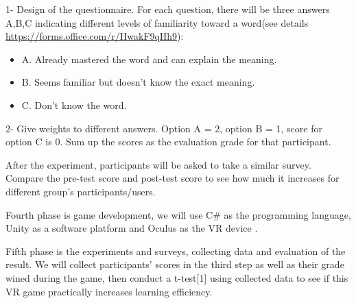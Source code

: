 \documentclass{vgtc}                          %
\begin{document}
1- Design of the questionnaire. For each question, there will be three answers A,B,C indicating different levels of familiarity toward a word(see details \url{https://forms.office.com/r/HwakF9qHh9}): 
\begin{itemize}
\item A. Already mastered the word and can explain the meaning.
\item B. Seems familiar but doesn't know the exact meaning.
\item C. Don’t know the word.
\end{itemize}

2- Give weights to different answers. Option A = 2, option B = 1, score for option C is 0. Sum up the scores as the evaluation grade for that participant.

After the experiment, participants will be asked to take a similar survey. 
Compare the pre-test score and post-test score to see how much it increases for different group's participants/users.

Fourth phase is game development, we will use C\# as the programming language, Unity as a software platform and Oculus as the VR device \cite{guimaraes2011game}.

Fifth phase is the experiments and surveys, collecting data and evaluation of the result. We will collect participants' scores in the third step as well as their grade wined during the game, then conduct a t-test[1] using collected data to see if this VR game practically increases learning efficiency. 
\end{document}
